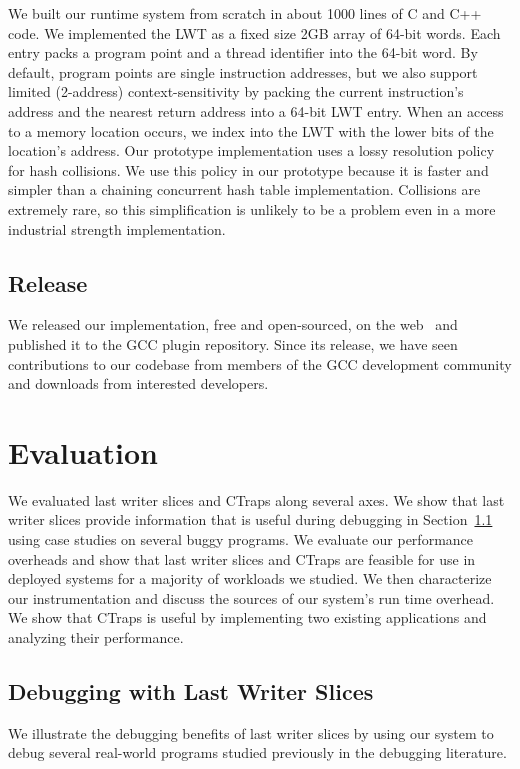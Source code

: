 \documentclass[preprint,9pt]{sigplanconf}
\newcommand{\ctraps}{CTraps\xspace}
\begin{document}
We built our runtime system from scratch in about 1000 lines of C and C++ code.
We implemented the LWT as a fixed size 2GB array of 64-bit words.  Each entry
packs a program point and a thread identifier into the 64-bit word.  By
default, program points are single instruction addresses, but we also support
limited (2-address) context-sensitivity by packing the current instruction's
address and the nearest return address into a 64-bit LWT entry. When an access
to a memory location occurs, we index into the LWT with the lower bits of the
location's address.  Our prototype implementation uses a lossy resolution
policy for hash collisions.  We use this policy in our prototype because it is
faster and simpler than a chaining concurrent hash table implementation.
Collisions are extremely rare, so this simplification is unlikely to be a
problem even in a more industrial strength implementation.  

\subsection{Release}
We released our implementation, free and open-sourced, on the
web~\cite{withheldforanonymity} and published it to the GCC plugin repository.
Since its release, we have seen contributions to our codebase from members of
the GCC development community and downloads from interested developers.

\section{Evaluation}
\label{sec:eval}
We evaluated last writer slices and \ctraps along several axes.  We show that
last writer slices provide information that is useful during debugging in
Section~\ref{sec:eval:debugging} using case studies on several buggy programs.
We evaluate our performance overheads and show that last writer slices and
\ctraps are feasible for use in deployed systems for a majority of workloads we
studied.  We then characterize our instrumentation and discuss the sources of
our system's run time overhead.   We show that \ctraps is useful by
implementing two existing applications and analyzing their performance.    

\subsection{Debugging with Last Writer Slices}
\label{sec:eval:debugging}
We illustrate the debugging benefits of last writer slices by using our system
to debug several real-world programs studied previously in the debugging
literature.    
\end{document}
